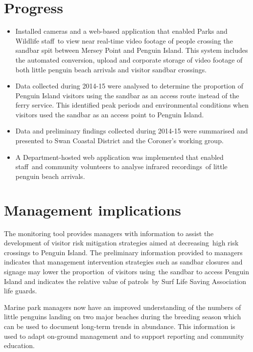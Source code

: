\documentclass[version=last,
    paper=a4, %
    10pt, %
    usenames,
    dvipsnames,
    oneside, %
    headings=openany, %
    DIV=15 %
]{scrbook}
\begin{document}
\section*{Progress}
\begin{itemize}
\itemsep1pt\parskip0pt
\item
  Installed cameras and a web-based application that enabled Parks and
  Wildlife staff~to view near real-time video footage of people crossing
  the sandbar spit between Mersey Point and Penguin Island. This system
  includes the automated conversion, upload and corporate storage of
  video footage of both little penguin beach arrivals and visitor
  sandbar crossings.
\item
  Data collected during 2014-15 were analysed to determine the
  proportion of Penguin Island visitors using the sandbar as an access
  route instead of the ferry service. This identified peak periods and
  environmental conditions when visitors used the sandbar as an access
  point to Penguin Island.
\item
  Data and preliminary findings collected during 2014-15 were summarised
  and presented to Swan Coastal District and the Coroner's working
  group.~
\item
  A Department-hosted web application was implemented that enabled
  staff~and community volunteers to analyse infrared recordings~of
  little penguin beach arrivals.
\end{itemize}



\section*{Management implications}
The monitoring tool provides managers with information to assist the
development of visitor risk mitigation strategies aimed at
decreasing~high risk crossings to Penguin Island. The preliminary
information provided to managers indicates that management intervention
strategies such as sandbar closures and signage may lower the
proportion~of visitors using~the sandbar to access Penguin Island and
indicates the relative value of patrols~by Surf Life Saving Association
life guards.~

Marine park managers now have an improved understanding of the numbers
of little penguins landing on two major beaches during the breeding
season which can be used to document long-term trends in abundance. This
information is used to adapt on-ground management and to support
reporting and community education.
\end{document}
